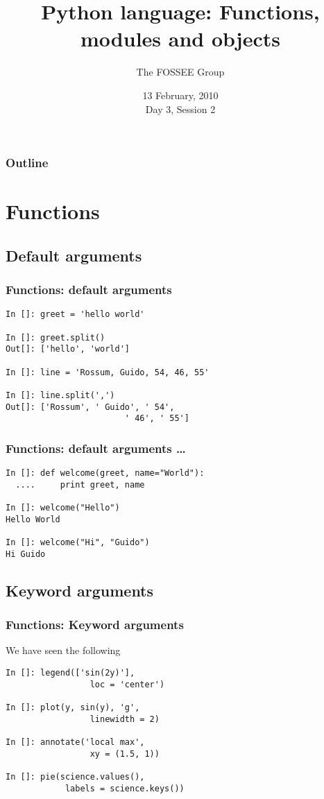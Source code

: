 \documentclass[14pt,compress]{beamer}
\title[Basic Python]{Python language: Functions, modules and objects}
\author[FOSSEE Team] {The FOSSEE Group}
\institute[IIT Bombay] {Department of Aerospace Engineering\\IIT Bombay}
\date[] {13 February, 2010\\Day 3, Session 2}
\begin{document}
\begin{frame}
  \titlepage
\end{frame}

\begin{frame}
  \frametitle{Outline}
  \tableofcontents
\end{frame}

\section{Functions}
\subsection{Default arguments}
\begin{frame}[fragile]
  \frametitle{Functions: default arguments}
  \begin{lstlisting}
In []: greet = 'hello world'

In []: greet.split()
Out[]: ['hello', 'world']

In []: line = 'Rossum, Guido, 54, 46, 55'

In []: line.split(',')
Out[]: ['Rossum', ' Guido', ' 54',
                        ' 46', ' 55']
  \end{lstlisting}
\end{frame}

\begin{frame}[fragile]
  \frametitle{Functions: default arguments \ldots}
  \begin{lstlisting}
In []: def welcome(greet, name="World"):
  ....     print greet, name

In []: welcome("Hello")
Hello World

In []: welcome("Hi", "Guido")
Hi Guido
  \end{lstlisting}
\end{frame} 

\subsection{Keyword arguments}
\begin{frame}[fragile]
  \frametitle{Functions: Keyword arguments}
We have seen the following
\begin{lstlisting}
In []: legend(['sin(2y)'], 
                 loc = 'center')

In []: plot(y, sin(y), 'g',
                 linewidth = 2)

In []: annotate('local max',
                 xy = (1.5, 1))

In []: pie(science.values(),
            labels = science.keys())
  \end{lstlisting}
\end{frame}
\end{document}
